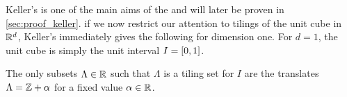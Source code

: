 \documentclass[../thesis.tex]{subfiles}
\begin{document}
Keller's  is one of the main aims of the  and will later be proven in \cref{sec:proof_keller}. 
 if we now restrict our attention to tilings of the unit cube in $\mathbb{R}^d$, Keller's  immediately gives the following for dimension one. For $d=1$, the unit cube is simply the unit interval $I = [0,1]$. %

\begin{lemma}\label{lem:tiling_unit_1d}
    The only subsets $\Lambda \in \mathbb{R}$ such that $\Lambda$ is a tiling set for $I$ are the translates $\Lambda = \mathbb{Z} +\alpha$ for a fixed value $\alpha\in \mathbb{R}$. 
\end{lemma}
\end{document}
